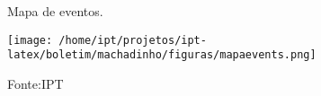 
\begin{figure}[h]
    \centering
	\captionsetup{justification=raggedright, singlelinecheck=false, width=1\textwidth}
    \caption{Mapa de eventos.}
    \texttt{[image: /home/ipt/projetos/ipt-latex/boletim/machadinho/figuras/mapaevents.png]}
    \caption*{Fonte:IPT}
\end{figure}
